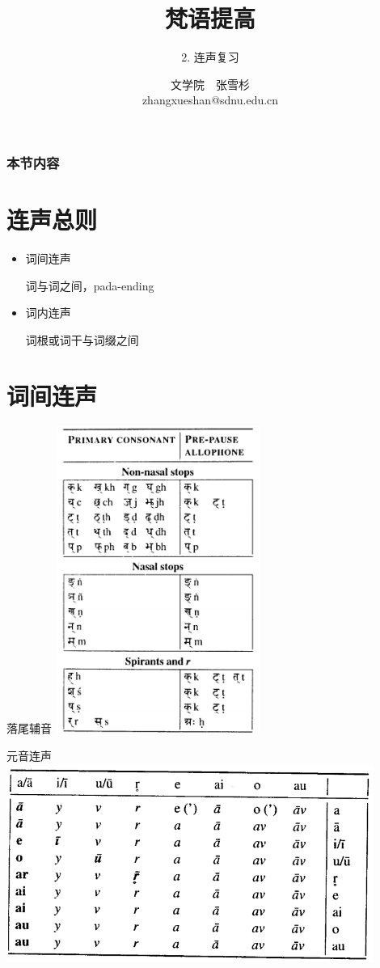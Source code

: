\documentclass[17pt]{beamer}
\title{{梵语提高}}
\subtitle{2. 连声复习}
\author[张雪杉]{文学院~~张雪杉 \\ zhangxueshan@sdnu.edu.cn}
\date{}
\begin{document}
\begin{frame}
  \titlepage
\end{frame}

\begin{frame}
  \frametitle{本节内容}
  \tableofcontents
\end{frame}

\section{连声总则}

\begin{frame}{\insertsection }
  \small
  \begin{itemize}
    \item 词间连声
    
    词与词之间，pada-ending
    \item 词内连声
    
    词根或词干与词缀之间
  \end{itemize}
\end{frame}

\section{词间连声}

\begin{frame}{落尾辅音}  
  \centering
  \includegraphics[width=0.5\textwidth]{consonantending.png} %
\end{frame}

\begin{frame}{元音连声}  
  \centering
  \includegraphics[width=0.9\textwidth]{vowelsandhi.png} %
\end{frame}
\end{document}
